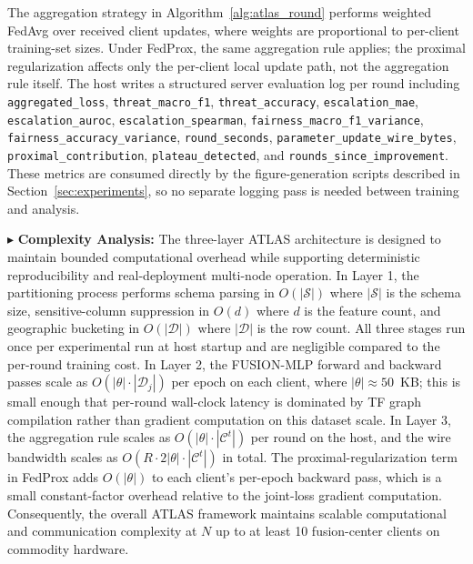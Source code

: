\documentclass[conference]{IEEEtran}
\begin{document}
The aggregation strategy in Algorithm~\ref{alg:atlas_round} performs weighted FedAvg over received client updates, where weights are proportional to per-client training-set sizes. Under FedProx, the same aggregation rule applies; the proximal regularization affects only the per-client local update path, not the aggregation rule itself. The host writes a structured server evaluation log per round including \texttt{aggregated\_loss}, \texttt{threat\_macro\_f1}, \texttt{threat\_accuracy}, \texttt{escalation\_mae}, \texttt{escalation\_auroc}, \texttt{escalation\_spearman}, \texttt{fairness\_macro\_f1\_variance}, \texttt{fairness\_accuracy\_variance}, \texttt{round\_seconds}, \texttt{parameter\_update\_wire\_bytes}, \texttt{proximal\_contribution}, \texttt{plateau\_detected}, and \texttt{rounds\_since\_improvement}. These metrics are consumed directly by the figure-generation scripts described in Section~\ref{sec:experiments}, so no separate logging pass is needed between training and analysis.

\noindent$\blacktriangleright$ \textbf{Complexity Analysis:}
The three-layer ATLAS architecture is designed to maintain bounded computational overhead while supporting deterministic reproducibility and real-deployment multi-node operation. In Layer 1, the partitioning process performs schema parsing in $O(|\mathcal{S}|)$ where $|\mathcal{S}|$ is the schema size, sensitive-column suppression in $O(d)$ where $d$ is the feature count, and geographic bucketing in $O(|\mathcal{D}|)$ where $|\mathcal{D}|$ is the row count. All three stages run once per experimental run at host startup and are negligible compared to the per-round training cost. In Layer 2, the FUSION-MLP forward and backward passes scale as $O(|\theta| \cdot |\mathcal{D}_{j}|)$ per epoch on each client, where $|\theta| \approx 50$~KB; this is small enough that per-round wall-clock latency is dominated by TF graph compilation rather than gradient computation on this dataset scale. In Layer 3, the aggregation rule scales as $O(|\theta| \cdot |\mathcal{C}^{t}|)$ per round on the host, and the wire bandwidth scales as $O(R \cdot 2|\theta| \cdot |\mathcal{C}^{t}|)$ in total. The proximal-regularization term in FedProx adds $O(|\theta|)$ to each client's per-epoch backward pass, which is a small constant-factor overhead relative to the joint-loss gradient computation. Consequently, the overall ATLAS framework maintains scalable computational and communication complexity at $N$ up to at least 10 fusion-center clients on commodity hardware.
\end{document}

